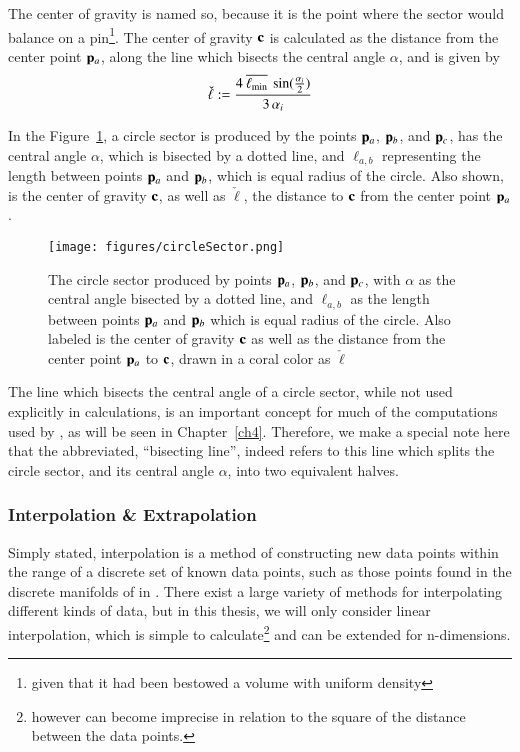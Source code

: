 The center of gravity is named so, because it is the point where the sector would balance on a pin\footnote{given that it had been bestowed a volume with uniform density}. The center of gravity $\mathbf{c}$ is calculated as the distance from the center point $\mathbf{p}_a$, along the line which bisects the central angle $\alpha$, and is given by
%
\begin{equation}
	\check{\ell} := \frac{4\:\overline{\ell_\text{min}}\:\sin(\frac{\alpha_i}{2})}{3\,\alpha_i}
	\label{eq:ch2distToCoG}
\end{equation}%
%
%

In the Figure~\ref{fig:circleSector}, a circle sector is produced by the points $\mathbf{p}_a$, $\mathbf{p}_b$, and $\mathbf{p}_c$, has the central angle $\alpha$, which is bisected by a dotted line, and $\ell_{a,b}$ representing the length between points $\mathbf{p}_a$ and $\mathbf{p}_b$, which is equal radius of the circle. Also shown, is the center of gravity $\mathbf{c}$, as well as $\check{\ell}$, the distance to $\mathbf{c}$ from the center point $\mathbf{p}_a$.

\begin{figure}[ht]
\ffigbox
	{\texttt{[image: figures/circleSector.png]}}
	{\caption[A Circle Sector in Detail]{The circle sector produced by points $\mathbf{p}_a$, $\mathbf{p}_b$, and $\mathbf{p}_c$, with $\alpha$ as the central angle bisected by a dotted line, and $\ell_{a,b}$ as the length between points $\mathbf{p}_a$ and $\mathbf{p}_b$ which is equal radius of the circle. Also labeled is the center of gravity $\mathbf{c}$ as well as the distance from the center point $\mathbf{p}_a$ to $\mathbf{c}$, drawn in a coral color as $\check{\ell}$}\label{fig:circleSector}}
\end{figure}

The line which bisects the central angle of a circle sector, while not used explicitly in calculations, is an important concept for much of the computations used by , as will be seen in Chapter~\ref{ch4}. Therefore, we make a special note here that the abbreviated, ``bisecting line'', indeed refers to this line which splits the circle sector, and its central angle $\alpha$, into two equivalent halves.%
%

%
%
\subsubsection{Interpolation \& Extrapolation}
\label{ch2sETBssGsssIE}
Simply stated, interpolation is a method of constructing new data points within the range of a discrete set of known data points, such as those points found in the discrete manifolds of in \tdd{}. There exist a large variety of methods for interpolating different kinds of data, but in this thesis, we will only consider linear interpolation, which is simple to calculate\footnote{however can become imprecise in relation to the square of the distance between the data points.} and can be extended for n-dimensions. 

